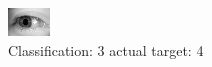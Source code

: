\begin{figure}[h!]
\begin{center}
\includegraphics[width=0.60\columnwidth]{figures/ID3236_class_3_target_4.png}
\end{center}
\caption{ Classification: 3 actual target: 4}
\label{fig:ID3236_class_3_target_4}
\end{figure}
